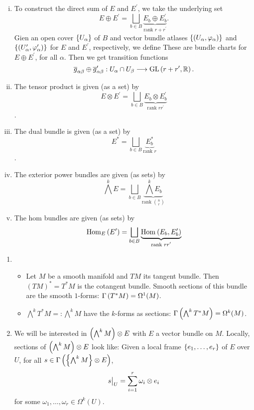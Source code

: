 \documentclass[main.tex]{subfiles}
\begin{document}
\begin{enumerate}[(i)]
    \item To construct the direct sum of $E$ and $E^\prime$, we take the underlying set \[E \oplus E^\prime = \bigsqcup_{b \in B} \underbrace{E_b \oplus  E^\prime_b}_{\text{rank }r+r^\prime }. \] Gien an open cover $\left\{U_\alpha\right\}$ of $B$ and vector bundle atlases $\left\{ \left(  U_\alpha, \varphi_\alpha  \right) \right\}$ and $\left\{ \left( U_\alpha^\prime, \varphi_\alpha^\prime \right) \right\}$ for $E$ and $E^\prime$, respectively, we define
    These are bundle charts for $E \oplus E^\prime$, for all $\alpha$. Then we get transition functions
    \[
    \overline{g}_{\alpha\beta} \oplus \overline{g}_{\alpha\beta}^\prime : U_\alpha \cap U_\beta \longrightarrow \text{GL}\left( r + r^\prime, \mathbb{R} \right).
    \]
    \item  The tensor product is given (as a set) by \[E \otimes E^\prime = \bigsqcup_{b \in B} \underbrace{E_b \otimes  E^\prime_b}_{\text{rank }rr^\prime }\].
     \item  The dual bundle is given (as a set) by \[E^*= \bigsqcup_{b \in B} \underbrace{E_b^*}_{\text{rank } r}\].
     \item The exterior power bundles are given (as sets) by
     \[
     \bigwedge^k E = \bigsqcup_{b \in B} \underbrace{\bigwedge^k E_b}_{\text{rank $n \choose r$}}
     \]
     \item The hom bundles are given (as sets) by
     \[
     \text{Hom}_{E}\left( E^\prime \right) = \bigsqcup_{b \in B} \underbrace{\text{Hom}_{}\left( E_b, E^\prime_b \right)}_{\text{rank $r r^\prime$}}
     \]
\end{enumerate}

\begin{exmp}
    \begin{enumerate}
        \item
            \begin{itemize}
                \item Let $M$ be a smooth manifold and $TM$ its tangent bundle. Then $(TM)^* = T^*M$ is the cotangent bundle. Smooth sections of this bundle are the smooth $1$-forms: $\Gamma\left( T^*M \right) = \Omega^1(M)$.
                \item $\bigwedge^k T^*M =: \bigwedge^k M$ have the $k$-forms as sections: $\Gamma\left( \bigwedge^k T^*M \right) = \Omega^k(M)$.
            \end{itemize}
        \item We will be interested in $\left(  \bigwedge^k M \right) \otimes E$ with $E$ a vector bundle on $M$. Locally, sections of $\left( \bigwedge^k M \right) \otimes E$ look like: Given a local frame $\left\{e_1, \dots, e_r\right\}$ of $E$ over $U$, for all $s \in \Gamma\left(  \left\{\bigwedge^k M\right\} \otimes E  \right)$,
        \[
        s\big|_{U} = \sum_{i=1}^r \omega_i \otimes e_i
        \] for some $\omega_1, \dots, \omega_r \in \Omega^k(U)$.
    \end{enumerate}
\end{exmp}
\end{document}

